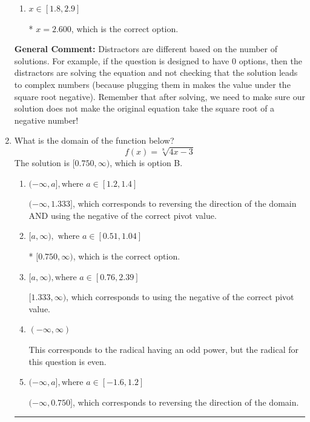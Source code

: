 \documentclass{extbook}[14pt]
\newcommand{\litem}[1]{\item #1

\rule{\textwidth}{0.4pt}}
\begin{document}
\begin{enumerate}
{\begin{enumerate}[label=\Alph*.]
$x = -4.000$ and $x = 2.600$, which corresponds to solving the equation correctly and including the value that makes the first square root 0.
\item \( x \in [1.8,2.9] \)

* $x = 2.600$, which is the correct option.
\end{enumerate}

\textbf{General Comment:} Distractors are different based on the number of solutions. For example, if the question is designed to have 0 options, then the distractors are solving the equation and not checking that the solution leads to complex numbers (because plugging them in makes the value under the square root negative). Remember that after solving, we need to make sure our solution does not make the original equation take the square root of a negative number!
}
\litem{
What is the domain of the function below?
\[ f(x) = \sqrt[8]{4 x - 3} \]The solution is \( [0.750, \infty) \), which is option B.\begin{enumerate}[label=\Alph*.]
\item \( (-\infty, a], \text{where } a \in [1.2, 1.4] \)

$(-\infty, 1.333]$, which corresponds to reversing the direction of the domain AND using the negative of the correct pivot value.
\item \( [a, \infty), \text{ where } a \in [0.51, 1.04] \)

* $[0.750, \infty)$, which is the correct option.
\item \( [a, \infty), \text{where } a \in [0.76, 2.39] \)

$[1.333, \infty)$, which corresponds to using the negative of the correct pivot value.
\item \( (-\infty, \infty) \)

This corresponds to the radical having an odd power, but the radical for this question is even.
\item \( (-\infty, a], \text{where } a \in [-1.6, 1.2] \)

 $(-\infty, 0.750]$, which corresponds to reversing the direction of the domain.
\end{enumerate}

}
\end{enumerate}
\end{document}
